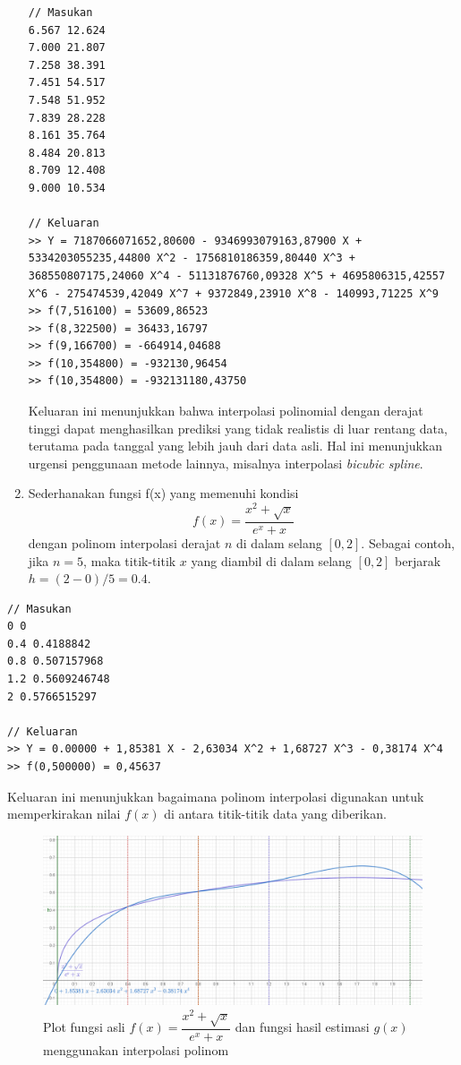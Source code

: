 \begin{enumerate}[label=(\alph*)]
\begin{lstlisting}[caption = interpol-b.txt]
// Masukan
6.567 12.624
7.000 21.807
7.258 38.391
7.451 54.517
7.548 51.952
7.839 28.228
8.161 35.764
8.484 20.813
8.709 12.408
9.000 10.534

// Keluaran
>> Y = 7187066071652,80600 - 9346993079163,87900 X + 5334203055235,44800 X^2 - 1756810186359,80440 X^3 + 368550807175,24060 X^4 - 51131876760,09328 X^5 + 4695806315,42557 X^6 - 275474539,42049 X^7 + 9372849,23910 X^8 - 140993,71225 X^9
>> f(7,516100) = 53609,86523
>> f(8,322500) = 36433,16797
>> f(9,166700) = -664914,04688
>> f(10,354800) = -932130,96454
>> f(10,354800) = -932131180,43750\end{lstlisting}

Keluaran ini menunjukkan bahwa interpolasi polinomial dengan derajat tinggi dapat menghasilkan prediksi yang tidak realistis di luar rentang data, terutama pada tanggal yang lebih jauh dari data asli. Hal ini menunjukkan urgensi penggunaan metode lainnya, misalnya interpolasi \textit{bicubic spline}.

\pagebreak
    \item 
    
    Sederhanakan fungsi f(x) yang memenuhi kondisi
    \[ f(x) = \frac{x^2 + \sqrt{x}}{e^x + x} \]
    dengan polinom interpolasi derajat $n$ di dalam selang $[0, 2]$. Sebagai contoh, jika $n = 5$, maka titik-titik $x$ yang diambil di dalam selang $[0, 2]$ berjarak $h = (2-0)/5 = 0.4$.
\end{enumerate}

\begin{lstlisting}[caption = interpol-c.txt]
// Masukan
0 0
0.4 0.4188842
0.8 0.507157968
1.2 0.5609246748
2 0.5766515297

// Keluaran
>> Y = 0.00000 + 1,85381 X - 2,63034 X^2 + 1,68727 X^3 - 0,38174 X^4 
>> f(0,500000) = 0,45637\end{lstlisting}

Keluaran ini menunjukkan bagaimana polinom interpolasi digunakan untuk memperkirakan nilai \( f(x) \) di antara titik-titik data yang diberikan.

\begin{figure}[H]
    \centering
    \includegraphics[width=0.75\linewidth]{image.png}
    \caption{Plot fungsi asli $f(x) = \dfrac{x^2 + \sqrt{x}}{e^x + x}$ dan fungsi hasil estimasi $g(x)$ menggunakan interpolasi polinom}
\end{figure}


